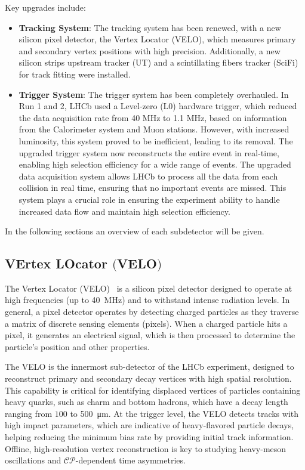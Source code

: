 Key upgrades include:
\begin{itemize}
\item \textbf{Tracking System}: The tracking system has been renewed, with a new silicon pixel detector, the Vertex Locator (VELO), which measures primary and secondary vertex positions with high precision. Additionally, a new silicon strips upstream tracker (UT) and a scintillating fibers tracker (SciFi) for track fitting were installed.

\item \textbf{Trigger System}: The trigger system has been completely overhauled. In Run 1 and 2, LHCb used a Level-zero (L$0$) hardware trigger, which reduced the data acquisition rate from 40 MHz to 1.1 MHz, based on information from the Calorimeter system and Muon stations. However, with increased luminosity, this system proved to be inefficient, leading to its removal. The upgraded trigger system now reconstructs the entire event in real-time, enabling high selection efficiency for a wide range of events. The upgraded data acquisition system allows LHCb to process all the data from each collision in real time, ensuring that no important events are missed. This system plays a crucial role in ensuring the experiment ability to handle increased data flow and maintain high selection efficiency.
\end{itemize}
In the following sections an overview of each subdetector will be given.

\subsection[VErtex LOcator]{VErtex LOcator $\bigl($VELO$\bigr)$}
The Vertex Locator (VELO)~\cite{Bediaga:2013tje} is a silicon pixel detector designed to operate at high frequencies (up to \SI{40}{\mega\hertz}) and to withstand intense radiation levels. In general, a pixel detector operates by detecting charged particles as they traverse a matrix of discrete sensing elements (pixels). When a charged particle hits a pixel, it generates an electrical signal, which is then processed to determine the particle's position and other properties.  

The VELO is the innermost sub-detector of the LHCb experiment, designed to reconstruct primary and secondary decay vertices with high spatial resolution. This capability is critical for identifying displaced vertices of particles containing heavy quarks, such as charm and bottom hadrons, which have a decay length ranging from $100$ to \SI{500}{\micro\meter}. At the trigger level, the VELO detects tracks with high impact parameters, which are indicative of heavy-flavored particle decays, helping reducing the minimum bias rate by providing initial track information. Offline, high-resolution vertex reconstruction is key to studying heavy-meson oscillations and $\mathcal{CP}$-dependent time asymmetries.

